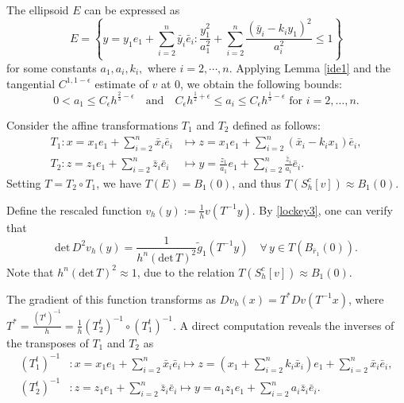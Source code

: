 \documentclass[11pt]{amsart}
\theoremstyle{plain}
\renewcommand{\det}{\mbox{det}}
\newcommand{\0}{\textbf{0}}
\numberwithin{equation}{section}
\numberwithin{equation}{section}
\numberwithin{figure}{section}
\begin{document}
The ellipsoid $E$ can be expressed as
\begin{equation}\label{elliptan}
E = \left\{y = y_1e_1 + \sum_{i=2}^n \bar{y}_i \bar{e}_i : \frac{y_1^2}{a_1^2} + \sum_{i=2}^n \frac{(\bar{y}_i - k_i y_1)^2}{a_i^2} \leq 1\right\}
\end{equation}
for some constants $a_1, a_i, k_i,$ where $i=2,\cdots, n.$
Applying Lemma \ref{ide1} and the tangential $C^{1,1-\epsilon}$ estimate of $v$ at $0$, we obtain the following bounds:
\begin{equation}\label{ai000}
0 < a_1 \leq C_\epsilon h^{\frac{2}{3}-\epsilon} \quad \text{and} \quad C_\epsilon h^{\frac{1}{2}+\epsilon} \leq a_i \leq C_\epsilon h^{\frac{1}{3}-\epsilon} \text{ for } i=2, \ldots, n.
\end{equation}

Consider the affine transformations \( T_1 \) and \( T_2 \) defined as follows:
\begin{align}
T_1: x = x_1e_1 + \sum_{i=2}^n \bar{x}_i \bar{e}_i &\mapsto z = x_1e_1 + \sum_{i=2}^n (\bar{x}_i - k_ix_1)\bar{e}_i, \label{afT1}\\
T_2: z = z_1e_1 + \sum_{i=2}^n \bar{z}_i \bar{e}_i &\mapsto y = \frac{z_1}{a_1}e_1 + \sum_{i=2}^n \frac{\bar{z}_i}{a_i} \bar{e}_i. \label{afT2}
\end{align}
Setting \( T = T_2 \circ T_1 \), we have \( T(E) = B_1(0) \), and thus \( T(S_h^c[v]) \approx B_1(0) \).


Define the rescaled function \( v_h(y) := \frac{1}{h}v(T^{-1}y) \).
By \eqref{lockey3}, one can verify that
\begin{equation}\label{vhma1}
\det\, D^2v_h(y) = \frac{1}{h^n(\det\, T)^{2}}\tilde{g}_1(T^{-1}y) \quad \forall\, y \in T(B_{\bar{r}_1}(0)).
\end{equation}
Note that 
\( h^n(\det\,T)^{2} \approx 1 \), due to the relation \( T(S_h^c[v]) \approx B_1(0) \).



The gradient of this function transforms as \( Dv_h(x) = T^*Dv(T^{-1}x) \), where \( T^* = \frac{(T^t)^{-1}}{h} = \frac{1}{h}(T_2^t)^{-1}\circ(T_1^t)^{-1} \). A direct computation reveals the inverses of the transposes of \( T_1 \) and \( T_2 \) as
\begin{align*}
(T_1^t)^{-1}&: x = x_1e_1 + \sum_{i=2}^n \bar{x}_i \bar{e}_i \mapsto z = \left(x_1 + \sum_{i=2}^n k_i \bar{x}_i\right)e_1 + \sum_{i=2}^n \bar{x}_i \bar{e}_i, \\
(T_2^t)^{-1}&: z = z_1e_1 + \sum_{i=2}^n \bar{z}_i \bar{e}_i \mapsto y = a_1 z_1e_1 + \sum_{i=2}^n a_i \bar{z}_i \bar{e}_i.
\end{align*}
\end{document}
